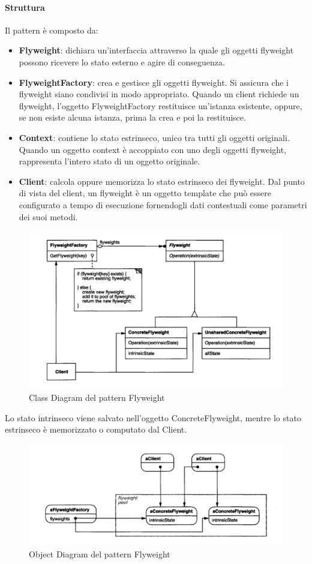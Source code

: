\paragraph{Struttura} Il pattern è composto da:
\begin{itemize}
    \item \textbf{Flyweight}: dichiara un’interfaccia attraverso la quale gli oggetti flyweight possono ricevere lo stato esterno e agire di conseguenza.
    \item \textbf{FlyweightFactory}: crea e gestisce gli oggetti flyweight. Si assicura che i flyweight siano condivisi in modo appropriato. Quando un client richiede un flyweight, l’oggetto FlyweightFactory restituisce un’istanza esistente, oppure, se non esiste alcuna istanza, prima la crea e poi la restituisce.
    \item \textbf{Context}: contiene lo stato estrinseco, unico tra tutti gli oggetti originali. Quando un oggetto context è accoppiato con uno degli oggetti flyweight, rappresenta l’intero stato di un oggetto originale.
    \item \textbf{Client}: calcola oppure memorizza lo stato estrinseco dei flyweight. Dal punto di vista del client, un flyweight è un oggetto template che può essere configurato a tempo di esecuzione fornendogli dati contestuali come parametri dei suoi metodi.
\end{itemize}

\begin{figure}[H]
    \centering
    \includegraphics[width=0.75\linewidth]{assets/pattern/flyweight/flyweight-struttura.png}
    \caption{Class Diagram del pattern Flyweight}
\end{figure}

Lo stato intrinseco viene salvato nell'oggetto ConcreteFlyweight, mentre lo stato estrinseco è memorizzato o computato dal Client.

\begin{figure}[H]
    \centering
    \includegraphics[width=0.75\linewidth]{assets/pattern/flyweight/flyweight-object-diagram.png}
    \caption{Object Diagram del pattern Flyweight}
\end{figure}

